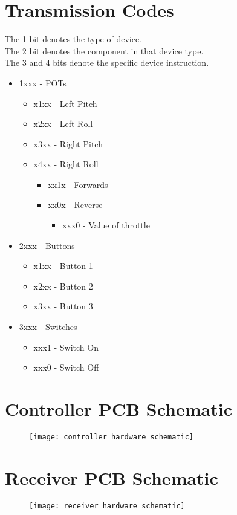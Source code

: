 \documentclass [11pt]{article}
\begin{document}
\section{Transmission Codes}\label{app:transmission_codes}
{\parindent0pt
The 1 bit denotes the type of device.\\
The 2 bit denotes the component in that device type.\\
The 3 and 4 bits denote the specific device instruction.\\
}
\begin{itemize}
\item 1xxx - POTs
    \begin{itemize}
        \item x1xx - Left Pitch
        \item x2xx - Left Roll
	    \item x3xx - Right Pitch
		\item x4xx - Right Roll
		\begin{itemize}
			\item xx1x - Forwards
			\item xx0x - Reverse
			\begin{itemize}
				\item xxx0 - Value of throttle
			\end{itemize}
		\end{itemize}
     \end{itemize}
\item 2xxx - Buttons
	\begin{itemize}
		\item x1xx - Button 1
		\item x2xx - Button 2
		\item x3xx - Button 3
	\end{itemize}
\item 3xxx - Switches
	\begin{itemize}
		\item xxx1 - Switch On
		\item xxx0 - Switch Off
	\end{itemize}
\end{itemize}

\section{Controller PCB Schematic}\label{app:controller_hardware_schematic}

\begin{figure}[H]
\centerline{\texttt{[image: controller\_hardware\_schematic]}}
\end{figure}

\section{Receiver PCB Schematic}\label{app:receiver_hardware_schematic}

\begin{figure}[H]
\centerline{\texttt{[image: receiver\_hardware\_schematic]}}
\end{figure}
\end{document}
